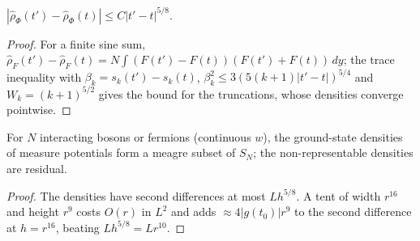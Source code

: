 \begin{theorem}
  \label{thm:line_measure_holder}
  \leanok
  $|\hat\rho_\Phi(t')-\hat\rho_\Phi(t)|\le C|t'-t|^{5/8}$.
\end{theorem}
\begin{proof}
  \leanok
  For a finite sine sum, $\hat\rho_F(t')-\hat\rho_F(t)=N\int(F(t')-F(t))(F(t')+F(t))\,dy$; the trace inequality with
  $\beta_k=s_k(t')-s_k(t)$, $\beta_k^2\le3(5(k+1)|t'-t|)^{5/4}$ and $W_k=(k+1)^{5/2}$ gives the bound for the truncations,
  whose densities converge pointwise.
\end{proof}

\begin{theorem}
  \label{thm:line_measureN_meagre}
  \leanok
  For $N$ interacting bosons or fermions (continuous $w$), the ground-state densities of measure potentials form a meagre
  subset of $S_N$; the non-representable densities are residual.
\end{theorem}
\begin{proof}
  \leanok
  The densities have second differences at most $Lh^{5/8}$. A tent of width $r^{16}$ and height $r^9$ costs $O(r)$ in $L^2$
  and adds $\approx4|g(t_0)|r^9$ to the second difference at $h=r^{16}$, beating $Lh^{5/8}=Lr^{10}$.
\end{proof}

